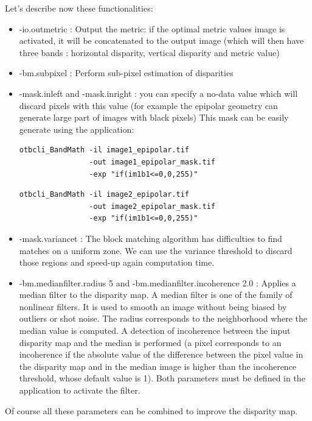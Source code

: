 Let's describe now these functionalities:

\begin{itemize}
\item -io.outmetric : Output the metric: if the optimal metric values image is
  activated, it will be concatenated to the output image (which will then
  have three bands : horizontal disparity, vertical disparity and metric value)
\item -bm.subpixel : Perform sub-pixel estimation of disparities
\item -mask.inleft and -mask.inright : you can specify a no-data value which
  will discard pixels with this value (for example the epipolar geometry can
  generate large part of images with black pixels)
  This mask can be easily generate using the  application:

\begin{verbatim}
otbcli_BandMath -il image1_epipolar.tif
                -out image1_epipolar_mask.tif
                -exp "if(im1b1<=0,0,255)"
\end{verbatim}

\begin{verbatim}
otbcli_BandMath -il image2_epipolar.tif
                -out image2_epipolar_mask.tif
                -exp "if(im1b1<=0,0,255)"
\end{verbatim}

\item -mask.variancet : The block matching algorithm has difficulties to find
  matches on a uniform zone. We can use the variance threshold to discard those
  regions and speed-up again computation time.
\item -bm.medianfilter.radius 5 and -bm.medianfilter.incoherence 2.0 : Applies a
  median filter to the disparity map. A median filter is one of the family of
  nonlinear filters. It is used to smooth an image without being biased by
  outliers or shot noise. The radius corresponds to the neighborhood where the
  median value is computed. A detection of incoherence between the input
  disparity map and the median is performed (a pixel corresponds to an
  incoherence if the absolute value of the difference between the pixel value in
  the disparity map and in the median image is higher than the incoherence
  threshold, whose default value is 1). Both parameters must be defined in the
  application to activate the filter.
\end{itemize}

Of course all these parameters can be combined to improve the disparity map.

